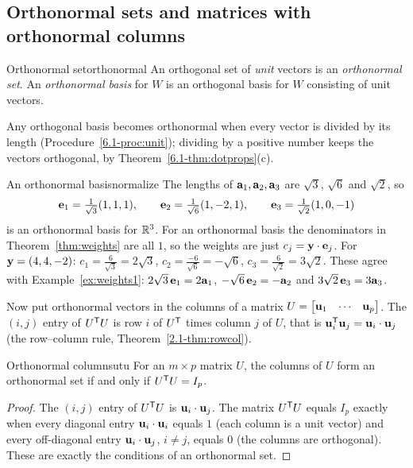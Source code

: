 \documentclass[11pt]{article}
\begin{document}
\subsection*{Orthonormal sets and matrices with orthonormal columns}

\begin{defn}{Orthonormal set}{orthonormal}
An orthogonal set of \emph{unit} vectors is an \emph{orthonormal set}. An \emph{orthonormal basis} for $W$ is an orthogonal basis for $W$ consisting of unit vectors.
\end{defn}

Any orthogonal basis becomes orthonormal when every vector is divided by its length (Procedure~\ref{6.1-proc:unit}); dividing by a positive number keeps the vectors orthogonal, by Theorem~\ref{6.1-thm:dotprops}(c).

\begin{exmp}{An orthonormal basis}{normalize}
The lengths of $\mathbf{a}_1,\mathbf{a}_2,\mathbf{a}_3$ are $\sqrt3$, $\sqrt6$ and $\sqrt2$, so
\[
\mathbf{e}_1=\tfrac1{\sqrt3}(1,1,1),\qquad\mathbf{e}_2=\tfrac1{\sqrt6}(1,-2,1),\qquad\mathbf{e}_3=\tfrac1{\sqrt2}(1,0,-1)
\]
is an orthonormal basis for $\mathbb{R}^3$. For an orthonormal basis the denominators in Theorem~\ref{thm:weights} are all $1$, so the weights are just $c_j=\mathbf{y}\cdot\mathbf{e}_j$. For $\mathbf{y}=(4,4,-2)$: $c_1=\tfrac{6}{\sqrt3}=2\sqrt3$, $c_2=\tfrac{-6}{\sqrt6}=-\sqrt6$, $c_3=\tfrac{6}{\sqrt2}=3\sqrt2$. These agree with Example~\ref{ex:weights1}: $2\sqrt3\,\mathbf{e}_1=2\mathbf{a}_1$, $-\sqrt6\,\mathbf{e}_2=-\mathbf{a}_2$ and $3\sqrt2\,\mathbf{e}_3=3\mathbf{a}_3$.
\end{exmp}

Now put orthonormal vectors in the columns of a matrix $U=\begin{bmatrix}\mathbf{u}_1&\cdots&\mathbf{u}_p\end{bmatrix}$. The $(i,j)$ entry of $U^{\mathsf T} U$ is row $i$ of $U^{\mathsf T}$ times column $j$ of $U$, that is $\mathbf{u}_i^{\mathsf T}\mathbf{u}_j=\mathbf{u}_i\cdot\mathbf{u}_j$ (the row--column rule, Theorem~\ref{2.1-thm:rowcol}).

\begin{thm}{Orthonormal columns}{utu}
For an $m\times p$ matrix $U$, the columns of $U$ form an orthonormal set if and only if $U^{\mathsf T} U=I_p$.
\end{thm}

\begin{proof}
The $(i,j)$ entry of $U^{\mathsf T} U$ is $\mathbf{u}_i\cdot\mathbf{u}_j$. The matrix $U^{\mathsf T} U$ equals $I_p$ exactly when every diagonal entry $\mathbf{u}_i\cdot\mathbf{u}_i$ equals $1$ (each column is a unit vector) and every off-diagonal entry $\mathbf{u}_i\cdot\mathbf{u}_j$, $i\neq j$, equals $0$ (the columns are orthogonal). These are exactly the conditions of an orthonormal set.
\end{proof}
\end{document}
